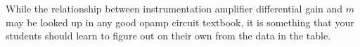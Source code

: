 





While the relationship between instrumentation amplifier differential gain and $m$ may be looked up in any good opamp circuit textbook, it is something that your students should learn to figure out on their own from the data in the table.




